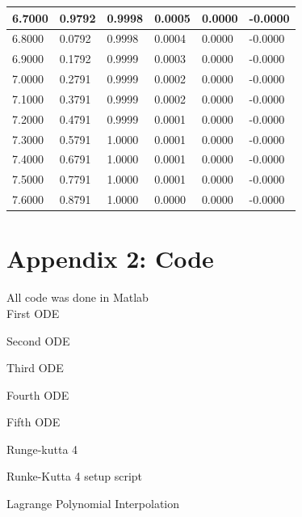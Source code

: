 \documentclass{article}
\begin{document}
\begin{table}[H]
\begin{tabular}{|l|l|l|l|l|l|}
    6.7000    &  0.9792   &     0.9998   &     0.0005   &     0.0000   &    -0.0000\\\hline
    6.8000    &  0.0792   &     0.9998   &     0.0004   &     0.0000   &    -0.0000\\\hline
    6.9000    &  0.1792   &     0.9999   &     0.0003   &     0.0000   &    -0.0000\\\hline
    7.0000    &  0.2791   &     0.9999   &     0.0002   &     0.0000   &    -0.0000\\\hline
    7.1000    &  0.3791   &     0.9999   &     0.0002   &     0.0000   &    -0.0000\\\hline
    7.2000    &  0.4791   &     0.9999   &     0.0001   &     0.0000   &    -0.0000\\\hline
    7.3000    &  0.5791   &     1.0000   &     0.0001   &     0.0000   &    -0.0000\\\hline
    7.4000    &  0.6791   &     1.0000   &     0.0001   &     0.0000   &    -0.0000\\\hline
    7.5000    &  0.7791   &     1.0000   &     0.0001   &     0.0000   &    -0.0000\\\hline
    7.6000    &  0.8791   &     1.0000   &     0.0000   &     0.0000   &    -0.0000\\\hline
\end{tabular}
\end{table}
\section*{Appendix 2: Code}
All code was done in Matlab\\
First ODE

Second ODE

Third ODE

Fourth ODE

Fifth ODE

Runge-kutta 4

Runke-Kutta 4 setup script

Lagrange Polynomial Interpolation

\end{document}
